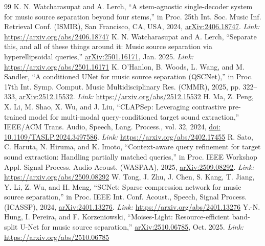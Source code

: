 \documentclass[12pt,a4paper]{article}
\begin{document}
\begin{thebibliography}{99}
\small
\setlength{\itemsep}{0.45em}
 K. N. Watcharasupat and A. Lerch, ``A stem-agnostic single-decoder system for music source separation beyond four stems,'' in Proc. 25th Int. Soc. Music Inf. Retrieval Conf. (ISMIR), San Francisco, CA, USA, 2024, \href{https://arxiv.org/abs/2406.18747}{arXiv:2406.18747}. \newline\textit{Link:} \url{https://arxiv.org/abs/2406.18747}
 K. N. Watcharasupat and A. Lerch, ``Separate this, and all of these things around it: Music source separation via hyperellipsoidal queries,'' \href{https://arxiv.org/abs/2501.16171}{arXiv:2501.16171}, Jan. 2025. \newline\textit{Link:} \url{https://arxiv.org/abs/2501.16171}
 K. O'Hanlon, B. Woods, L. Wang, and M. Sandler, ``A conditioned UNet for music source separation (QSCNet),'' in Proc. 17th Int. Symp. Comput. Music Multidisciplinary Res. (CMMR), 2025, pp. 322--333, \href{https://arxiv.org/abs/2512.15532}{arXiv:2512.15532}. \newline\textit{Link:} \url{https://arxiv.org/abs/2512.15532}
 H. Ma, Z. Peng, X. Li, M. Shao, X. Wu, and J. Liu, ``CLAPSep: Leveraging contrastive pre-trained model for multi-modal query-conditioned target sound extraction,'' IEEE/ACM Trans. Audio, Speech, Lang. Process., vol. 32, 2024, \href{https://doi.org/10.1109/TASLP.2024.3497586}{doi: 10.1109/TASLP.2024.3497586}. \newline\textit{Link:} \url{https://arxiv.org/abs/2402.17455}
 R. Sato, C. Haruta, N. Hiruma, and K. Imoto, ``Context-aware query refinement for target sound extraction: Handling partially matched queries,'' in Proc. IEEE Workshop Appl. Signal Process. Audio Acoust. (WASPAA), 2025, \href{https://arxiv.org/abs/2509.08292}{arXiv:2509.08292}. \newline\textit{Link:} \url{https://arxiv.org/abs/2509.08292}
 W. Tong, J. Zhu, J. Chen, S. Kang, T. Jiang, Y. Li, Z. Wu, and H. Meng, ``SCNet: Sparse compression network for music source separation,'' in Proc. IEEE Int. Conf. Acoust., Speech, Signal Process. (ICASSP), 2024, \href{https://arxiv.org/abs/2401.13276}{arXiv:2401.13276}. \newline\textit{Link:} \url{https://arxiv.org/abs/2401.13276}
 Y.-N. Hung, I. Pereira, and F. Korzeniowski, ``Moises-Light: Resource-efficient band-split U-Net for music source separation,'' \href{https://arxiv.org/abs/2510.06785}{arXiv:2510.06785}, Oct. 2025. \newline\textit{Link:} \url{https://arxiv.org/abs/2510.06785}

\end{thebibliography}
\end{document}
